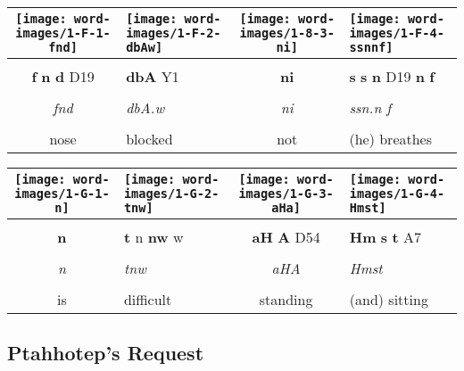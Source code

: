 \vspace{7.5mm}

\begin{tabularx}{\linewidth}{cYcY}
	\texttt{[image: word-images/1-F-1-fnd]} &
	\texttt{[image: word-images/1-F-2-dbAw]} &
	\texttt{[image: word-images/1-8-3-ni]} &
	\texttt{[image: word-images/1-F-4-ssnnf]} \\
	\hline \\ 
	\textbf{f} \textbf{n} \textbf{d} D19 &
	\textbf{dbA} Y1 &
	\textbf{ni} &
	\textbf{s} \textbf{s} \textbf{n} D19 \textbf{n} \textbf{f} \\
	\hline \\ 
	\textit{fnd} & \textit{dbA.w} & \textit{ni} & \textit{ssn.n f} \\
	\hline \\ 
	nose & blocked & not & (he) breathes
\end{tabularx}

\vspace{7.5mm}

\begin{tabularx}{\linewidth}{cYcY}
	\texttt{[image: word-images/1-G-1-n]} &
	\hspace*{-2mm}\texttt{[image: word-images/1-G-2-tnw]} &
	\hspace*{-2mm}\texttt{[image: word-images/1-G-3-aHa]} &
	\hspace*{-2mm}\texttt{[image: word-images/1-G-4-Hmst]} \\
	\hline \\ 
	\textbf{n} &
	\textbf{t} n \textbf{nw} w &
	\textbf{aH} \textbf{A} D54 &
	\textbf{Hm} \textbf{s} \textbf{t} A7 \\
	\hline \\ 
	\textit{n} & \textit{tnw} & \textit{aHA} & \textit{Hmst} \\
	\hline \\ 
	is & difficult & standing & (and) sitting
\end{tabularx}

\vspace*{\fill}

\pagebreak

\subsection*{Ptahhotep's Request}

\vspace*{\fill}

